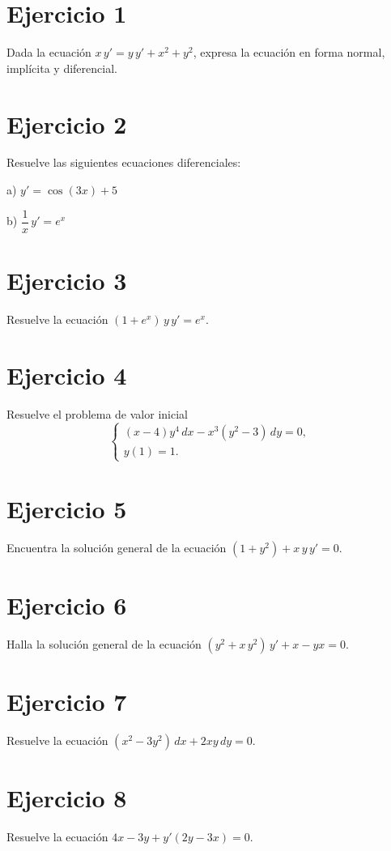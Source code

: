 \documentclass[12pt]{article}
\begin{document}
\section*{Ejercicio 1}
Dada la ecuación $x\,y' = y\,y' + x^2 + y^2$, expresa la ecuación en forma normal, implícita y diferencial.

\section*{Ejercicio 2}
Resuelve las siguientes ecuaciones diferenciales:

a) $y' = \cos(3x) + 5$

b) $\dfrac{1}{x}\,y' = e^x$

\section*{Ejercicio 3}
Resuelve la ecuación $(1 + e^x)\,y\,y' = e^x$.

\section*{Ejercicio 4}
Resuelve el problema de valor inicial
\[
\begin{cases}
(x - 4)y^4\,dx - x^3(y^2 - 3)\,dy = 0, \\
y(1) = 1.
\end{cases}
\]

\section*{Ejercicio 5}
Encuentra la solución general de la ecuación $(1 + y^2) + x\,y\,y' = 0$.

\section*{Ejercicio 6}
Halla la solución general de la ecuación $(y^2 + x\,y^2)\,y' + x - yx = 0$.

\section*{Ejercicio 7}
Resuelve la ecuación $(x^2 - 3y^2)\,dx + 2xy\,dy = 0$.

\section*{Ejercicio 8}
Resuelve la ecuación $4x - 3y + y'(2y - 3x) = 0$.
\end{document}

